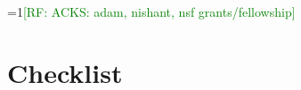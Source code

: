 \documentclass{article} %
\newcommand{\Comments}{0}
\newcommand{\mynote}[2]{\ifnum\Comments=1\textcolor{#1}{#2}\fi}
\newcommand{\raf}[1]{\mynote{green}{[RF: #1]}}
\begin{document}
%
%
%
%

\raf{ACKS: adam, nishant, nsf grants/fellowship}





\newpage
\section*{Checklist}
\end{document}
